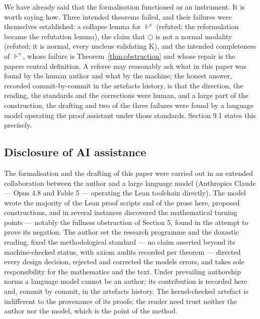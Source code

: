 We have already said that the formalisation functioned as an
instrument. It is worth saying how. Three intended theorems failed, and
their failures were themselves established: a collapse lemma for \ensuremath{\Vdash^{\mathrm{s}}}
(refuted; the reformulation became the refutation lemma), the claim that \ensuremath{\bigcirc} is
not a normal modality (refuted; it is normal, every nucleus validating
K), and the intended completeness of \ensuremath{\Vdash^{\mathrm{s}}}, whose failure is
Theorem~\ref{thm:obstruction} and whose repair is the paper\textquotesingle s central
definition. A referee may
reasonably ask what in this paper was found by the human author and
what by the machine; the honest answer, recorded commit-by-commit in
the artefact\textquotesingle s history, is that the direction, the reading, the
standards and the corrections were human, and a large part of the
construction, the drafting and two of the three failures were found by
a language model operating the proof assistant under those standards.
Section 9.1 states this precisely.

\subsection{Disclosure of AI assistance}\label{91-disclosure-of-ai-assistance}

The formalisation and the drafting of this paper were carried out in an
extended collaboration between the author and a large language model
(Anthropic\textquotesingle s Claude --- Opus 4.8 and Fable 5 --- operating the Lean
toolchain directly). The model wrote the majority of the Lean proof
scripts and of the prose here, proposed constructions, and in several
instances discovered the mathematical turning points --- notably the
fullness obstruction of Section 5, found in the attempt to prove its
negation. The author set the research programme and the doxastic
reading, fixed the methodological standard --- no claim asserted beyond
its machine-checked status, with axiom audits recorded per theorem ---
directed every design decision, rejected and corrected the model\textquotesingle s
errors, and takes sole responsibility for the mathematics and the text.
Under prevailing authorship norms a language model cannot be an author;
its contribution is recorded here and, commit by commit, in the
artefact\textquotesingle s history. The kernel-checked artefact is indifferent to the
provenance of its proofs; the reader need trust neither the author nor
the model, which is the point of the method.

